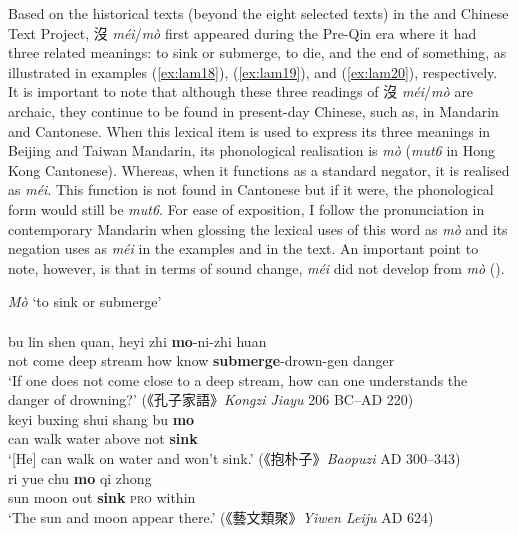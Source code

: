 \documentclass[output=paper]{langscibook}
\begin{document}
Based on the historical texts (beyond the eight selected texts) in the \cite{chant} and Chinese Text Project, 沒 \textit{méi}/\textit{mò} first appeared during the Pre-Qin era where it had three related meanings: to sink or submerge, to die, and the end of something, as illustrated in examples (\ref{ex:lam18}), (\ref{ex:lam19}), and (\ref{ex:lam20}), respectively. It is important to note that although these three readings of 沒 \textit{méi}/\textit{mò}  are archaic, they continue to be found in present-day Chinese, such as, in Mandarin and Cantonese. When this lexical item is used to express its three meanings in Beijing and Taiwan Mandarin, its phonological realisation is \textit{mò} (\textit{mut6} in Hong Kong Cantonese). Whereas, when it functions as a standard negator, it is realised as \textit{méi}. This function is not found in Cantonese but if it were, the phonological form would still be \textit{mut6}. For ease of exposition, I follow the pronunciation in contemporary Mandarin when glossing the lexical uses of this word as \textit{mò} and its negation uses as \textit{méi} in the examples and in the text. An important point to note, however, is that in terms of sound change, \textit{méi} did not develop from \textit{mò} (\citealt[390]{Schuessler2007}).

\ea \textit{Mò} `to sink or submerge'  \label{ex:lam18}\\
   \label{ex:lam18a}\\
  	\gll bu lin shen quan, heyi zhi \textbf{mo}-ni-zhi huan\\
  	not come	 deep stream how know \textbf{submerge}-drown-gen danger\\ 
  	\glt `If one does not come close to a deep stream, how can one understands the danger of drowning?' ({\cn 《孔子家語》}\emph{Kongzi Jiayu} 206 BC–AD 220)
  \label{ex:lam18b}\\
  	\gll keyi buxing shui shang bu \textbf{mo}\\ 
  	can walk water above not \textbf{sink}\\
  	\glt `[He] can walk on water and won't sink.' ({\cn 《抱朴子》}\emph{Baopuzi} AD 300–343)
   \label{ex:lam18c}\\
	\gll ri yue chu \textbf{mo} qi zhong\\ 
	sun	moon	 out \textbf{sink} \textsc{pro} within\\ 
	\glt `The sun and moon appear there.' ({\cn 《藝文類聚》}\emph{Yiwen Leiju} AD 624)
\z \z 
\end{document}
